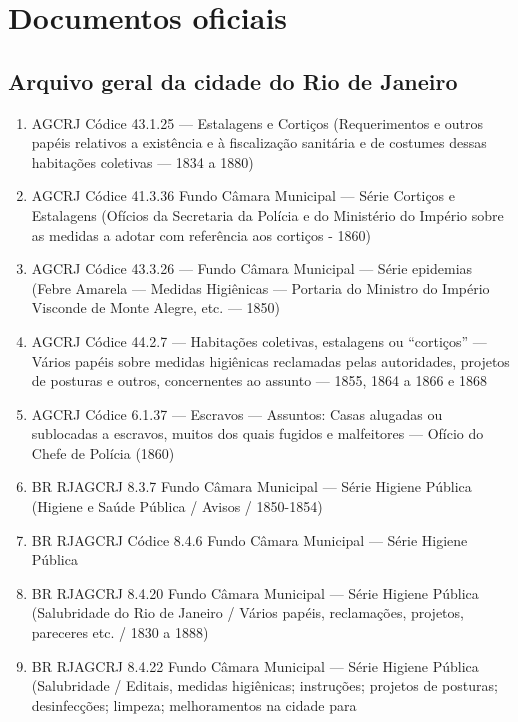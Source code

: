 \section*{Documentos oficiais}\label{documentos-oficiais}

\subsection*{Arquivo geral da cidade do Rio de
Janeiro}\label{arquivo-geral-da-cidade-do-rio-de-janeiro}

\begin{enumerate}
\def\labelenumi{\arabic{enumi}.}
\item
  AGCRJ Códice 43.1.25 --- Estalagens e Cortiços (Requerimentos e outros
  papéis relativos a existência e à fiscalização sanitária e de costumes
  dessas habitações coletivas --- 1834 a 1880)
\item
  AGCRJ Códice 41.3.36 Fundo Câmara Municipal --- Série Cortiços e
  Estalagens (Ofícios da Secretaria da Polícia e do Ministério do
  Império sobre as medidas a adotar com referência aos cortiços - 1860)
\item
  AGCRJ Códice 43.3.26 --- Fundo Câmara Municipal --- Série epidemias
  (Febre Amarela --- Medidas Higiênicas --- Portaria do Ministro do
  Império Visconde de Monte Alegre, etc. --- 1850)
\item
  AGCRJ Códice 44.2.7 --- Habitações coletivas, estalagens ou
  ``cortiços'' --- Vários papéis sobre medidas higiênicas reclamadas
  pelas autoridades, projetos de posturas e outros, concernentes ao
  assunto --- 1855, 1864 a 1866 e 1868
\item
  AGCRJ Códice 6.1.37 --- Escravos --- Assuntos: Casas alugadas ou
  sublocadas a escravos, muitos dos quais fugidos e malfeitores ---
  Ofício do Chefe de Polícia (1860)
\item
  BR RJAGCRJ 8.3.7 Fundo Câmara Municipal --- Série Higiene Pública
  (Higiene e Saúde Pública / Avisos / 1850-1854)
\item
  BR RJAGCRJ Códice 8.4.6 Fundo Câmara Municipal --- Série Higiene
  Pública
\item
  BR RJAGCRJ 8.4.20 Fundo Câmara Municipal --- Série Higiene Pública
  (Salubridade do Rio de Janeiro / Vários papéis, reclamações, projetos,
  pareceres etc. / 1830 a 1888)
\item
  BR RJAGCRJ 8.4.22 Fundo Câmara Municipal --- Série Higiene Pública
  (Salubridade / Editais, medidas higiênicas; instruções; projetos de
  posturas; desinfecções; limpeza; melhoramentos na cidade para

\end{enumerate}
